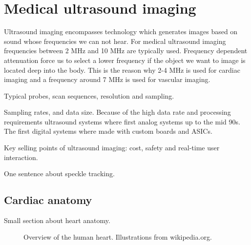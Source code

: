 \section {Medical ultrasound imaging}\label{sec:ultrasound}
Ultrasound imaging encompasses technology which generates images based on sound whose frequencies we can not hear. For medical ultrasound imaging frequencies between 2 MHz and 10 MHz are typically used. Frequency dependent attenuation force us to select a lower frequency if the object we want to image is located deep into the body. This is the reason why 2-4 MHz is used for cardiac imaging and a frequency around 7 MHz is used for vascular imaging.

Typical probes, scan sequences, resolution and sampling.

Sampling rates, and data size.
Because of the high data rate and processing requirements ultrasound systems where first analog systems up to the mid 90s. The first digital systems where made with custom boards and ASICs.

Key selling points of ultrasound imaging: cost, safety and real-time user interaction.

One sentence about speckle tracking.

\subsection{Cardiac anatomy}
Small section about heart anatomy.

\begin{figure}
\centering
{}
\caption{Overview of the human heart. Illustrations from wikipedia.org.}
\label{fig:human_heart}
\end{figure}
							
